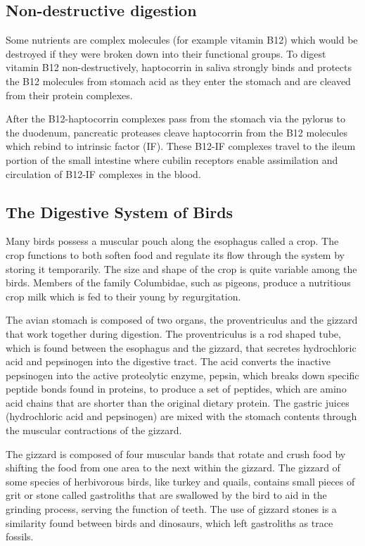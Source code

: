 \hypertarget{non-destructive-digestion}{%
\subsection{Non-destructive digestion}\label{non-destructive-digestion}}

Some nutrients are complex molecules (for example vitamin B12) which would be destroyed if they were broken down into their functional groups. To digest vitamin B12 non-destructively, haptocorrin in saliva strongly binds and protects the B12 molecules from stomach acid as they enter the stomach and are cleaved from their protein complexes.

After the B12-haptocorrin complexes pass from the stomach via the pylorus to the duodenum, pancreatic proteases cleave haptocorrin from the B12 molecules which rebind to intrinsic factor (IF). These B12-IF complexes travel to the ileum portion of the small intestine where cubilin receptors enable assimilation and circulation of B12-IF complexes in the blood.

\hypertarget{the-digestive-system-of-birds}{%
\subsection{The Digestive System of Birds}\label{the-digestive-system-of-birds}}

Many birds possess a muscular pouch along the esophagus called a crop. The crop functions to both soften food and regulate its flow through the system by storing it temporarily. The size and shape of the crop is quite variable among the birds. Members of the family Columbidae, such as pigeons, produce a nutritious crop milk which is fed to their young by regurgitation.

The avian stomach is composed of two organs, the proventriculus and the gizzard that work together during digestion. The proventriculus is a rod shaped tube, which is found between the esophagus and the gizzard, that secretes hydrochloric acid and pepsinogen into the digestive tract. The acid converts the inactive pepsinogen into the active proteolytic enzyme, pepsin, which breaks down specific peptide bonds found in proteins, to produce a set of peptides, which are amino acid chains that are shorter than the original dietary protein. The gastric juices (hydrochloric acid and pepsinogen) are mixed with the stomach contents through the muscular contractions of the gizzard.

The gizzard is composed of four muscular bands that rotate and crush food by shifting the food from one area to the next within the gizzard. The gizzard of some species of herbivorous birds, like turkey and quails, contains small pieces of grit or stone called gastroliths that are swallowed by the bird to aid in the grinding process, serving the function of teeth. The use of gizzard stones is a similarity found between birds and dinosaurs, which left gastroliths as trace fossils.

